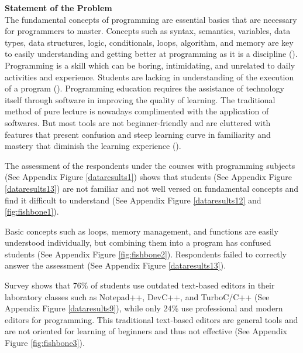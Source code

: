 \flushleft
\textbf{Statement of the Problem}\\

\justifying
\parx
The fundamental concepts of programming are essential basics that are necessary
for programmers to master. Concepts such as syntax, semantics, variables, data
types, data structures, logic, conditionals, loops, algorithm, and memory are
key to easily understanding and getting better at programming as it is a
discipline (\cite{prahofer_hurnaus_wirth_mossenbock_2007}).
Programming is a skill which can be boring, intimidating, and unrelated to daily
activities and experience. Students are lacking in understanding of the
execution of a program (\cite{tan_2019}).
Programming education requires the assistance of technology itself through
software in improving the quality of learning. The traditional method of pure
lecture is nowadays complimented with the application of softwares. But most
tools are not beginner-friendly and are cluttered with features that present
confusion and steep learning curve in familiarity and mastery that diminish the
learning experience (\cite{tsukamoto_2016}).

\justifying
\parx
The assessment of the respondents under the courses with programming subjects
(See Appendix Figure \ref{dataresults1}) shows that students (See Appendix
Figure \ref{dataresults13})
are not familiar and not well versed on fundamental concepts and find it
difficult to understand
(See Appendix Figure \ref{dataresults12} and \ref{fig:fishbone1}).

\parx
Basic concepts such as loops, memory management, and functions are easily
understood individually, but combining them into a program has confused students
(See Appendix Figure \ref{fig:fishbone2}). Respondents failed to correctly
answer the assessment (See Appendix Figure \ref{dataresults13}).

\parx
Survey shows that 76\% of students use outdated text-based editors in their
laboratory classes such as Notepad++, DevC++, and TurboC/C++ (See
Appendix Figure \ref{dataresults9}), while only 24\% use professional and modern editors
for programming. This traditional text-based editors are general tools and are
not oriented for learning of beginners and thus not effective (See Appendix
Figure \ref{fig:fishbone3}).
